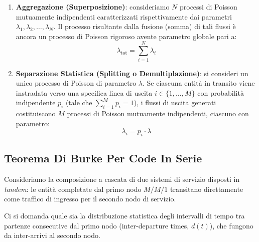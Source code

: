 \documentclass[11pt, a4paper]{article}
\begin{document}

\begin{enumerate}
    \item \textbf{Aggregazione (Superposizione)}: consideriamo $N$ processi di Poisson mutuamente indipendenti caratterizzati rispettivamente dai parametri $\lambda_1, \lambda_2, \dots, \lambda_N$. Il processo risultante dalla fusione (somma) di tali flussi è ancora un processo di Poisson rigoroso avente parametro globale pari a:
    \[
    \boxed{\lambda_{\text{tot}} = \sum_{i=1}^N \lambda_i}
    \]


    \item \textbf{Separazione Statistica (Splitting o Demultiplazione)}: si consideri un unico processo di Poisson di parametro $\lambda$. Se ciascuna entità in transito viene instradata verso una specifica linea di uscita $i \in \{1, \dots, M\}$ con probabilità indipendente $p_i$ (tale che $\sum_{i=1}^M p_i = 1$), i flussi di uscita generati costituiscono $M$ processi di Poisson mutuamente indipendenti, ciascuno con parametro:
    \[
    \boxed{\lambda_i = p_i \cdot \lambda}
    \]
\end{enumerate}

\subsection{Teorema Di Burke Per Code In Serie}

Consideriamo la composizione a cascata di due sistemi di servizio disposti in \emph{tandem}: le entità completate dal primo nodo $M/M/1$ transitano direttamente come traffico di ingresso per il secondo nodo di servizio.


Ci si domanda quale sia la distribuzione statistica degli intervalli di tempo tra partenze consecutive dal primo nodo (inter-departure times, $d(t)$), che fungono da inter-arrivi al secondo nodo.
\end{document}
